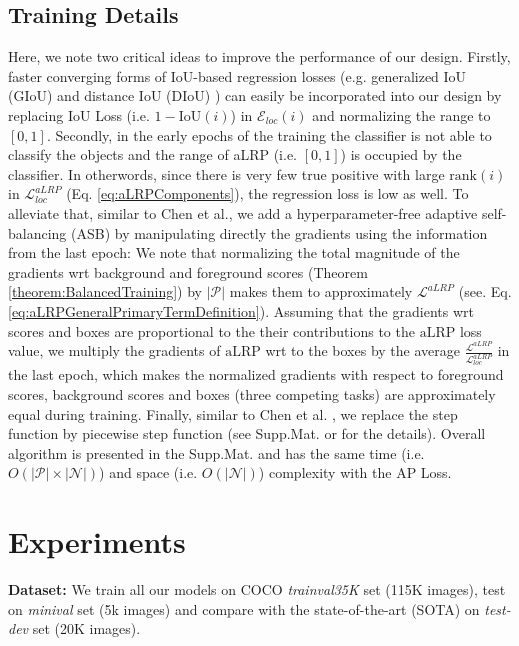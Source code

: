 \documentclass{article}
\begin{document}
{\subsection{Training Details}
\label{subsec:TrainingDetails}
Here, we note two critical ideas to improve the performance of our design. Firstly, faster converging forms of IoU-based regression losses (e.g. generalized IoU (GIoU) \cite{GIoULoss} and distance IoU (DIoU) \cite{DIoULoss}) can easily be incorporated into our design by replacing IoU Loss (i.e. $1- \mathrm{IoU}(i)$) in $\mathcal{E}_{loc}(i)$ and normalizing the range to $[0,1]$. Secondly, in the early epochs of the training the classifier is not able to classify the objects and the range of aLRP (i.e. $[0,1]$) is occupied by the classifier. In otherwords, since there is very few true positive with large $\mathrm{rank}(i)$ in $\mathcal{L}^{aLRP}_{loc}$ (Eq. \ref{eq:aLRPComponents}), the regression loss is low as well. To alleviate that, similar to Chen et al.\cite{GradNorm}, we add a hyperparameter-free adaptive self-balancing (ASB) by manipulating directly the gradients using the information from the last epoch: We note that normalizing the total magnitude of the gradients wrt background and foreground scores (Theorem \ref{theorem:BalancedTraining}) by $|\mathcal{P}|$  makes them to approximately $\mathcal{L}^{aLRP}$ (see. Eq. \ref{eq:aLRPGeneralPrimaryTermDefinition}). Assuming that the gradients wrt scores and boxes are proportional to the their contributions to the $\mathrm{aLRP}$ loss value, we multiply the gradients of $\mathrm{aLRP}$ wrt to the boxes by the average $ \frac{\mathcal{L}^{aLRP}}{\mathcal{L}^{aLRP}_{loc}}$ in the last epoch, which makes the normalized gradients with respect to foreground scores, background scores and boxes (three competing tasks) are approximately equal during training. Finally, similar to Chen et al. \cite{APLoss}, we replace the step function by piecewise step function (see Supp.Mat. or \cite{APLoss} for the details). Overall algorithm is presented in the Supp.Mat. and has the same time (i.e. $O(|\mathcal{P}| \times|\mathcal{N}|)$) and space (i.e. $O(|\mathcal{N}|)$) complexity with the AP Loss.  


} \section{Experiments}
\label{sec:Experiments}

\textbf{Dataset:} We train all our models on  COCO \textit{trainval35K} set \cite{COCO} (115K images), test on \textit{minival} set (5k images) and compare with the state-of-the-art (SOTA) on \textit{test-dev} set (20K images). 
\end{document}
